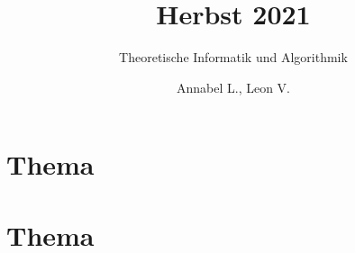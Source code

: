 \documentclass[stex]{ddifau}
\title{Herbst 2021}
\subtitle{Theoretische Informatik und Algorithmik}
\author{Annabel L., Leon V.}
\begin{document}
	\maketitle



\section{Thema}

\clearpage

\section{Thema}

\clearpage
\end{document}
